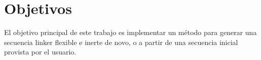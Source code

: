 \section{Objetivos}

El objetivo principal de este trabajo es implementar un método para generar una secuencia linker flexible e inerte de novo, o a partir de una secuencia inicial provista por el usuario. 

